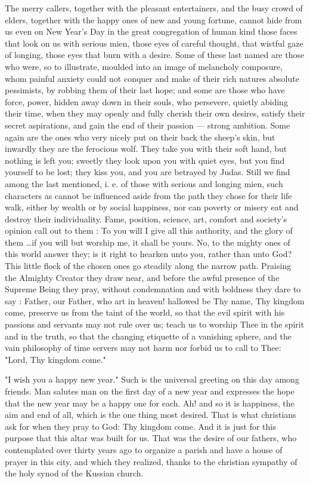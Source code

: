 The merry callers, together with the pleasant 
entertainers, and the busy crowd of elders, together
with the happy ones of new and young 
fortune, cannot hide from us even on New 
Year's Day in the great congregation of human 
kind those faces that look on us with serious 
mien, those eyes of careful thought, that wistful
gaze of longing, those eyes that burn with 
a desire. Some of these last named are those 
who were, so to illustrate, moulded into an 
image of melancholy composure, whom painful 
anxiety could not conquer and make of their 
rich natures absolute pessimists, by robbing 
them of their last hope; and some are those 
who have force, power, hidden away down in 
their souls, who persevere, quietly abiding their 
time, when they may openly and fully cherish 
their own desires, satisfy their secret aspirations,
and gain the end of their passion — strong 
ambition. Some again are the ones who very 
nicely put on their back the sheep's skin, but 
inwardly they are the ferocious wolf. They take 
you with their soft hand, but nothing is left 
you; sweetly they look upon you with quiet 
eyes, but you find yourself to be lost; they kiss 
you, and you are betrayed by Judas. Still we 
find among the last mentioned, i. e. of those 
with serious and longing mien, such characters 
as cannot be influenced aside from the path they 
chose for their life walk, either by wealth or by 
social happiness, nor can poverty or misery eat 
and destroy their individuality. Fame, position, 
science, art, comfort and society's opinion call 
out to them : To you will I give all this authority,
and the glory of them \ldots if you will
but worship me, it shall be yours. No, to the 
mighty ones of this world answer they; is it 
right to hearken unto you, rather than unto 
God? This little flock of the chosen ones go 
steadily along the narrow path. Praising the 
Almighty Creator they draw near, and before 
the awful presence of the Supreme Being they 
pray, without condemnation and with boldness 
they dare to say : Father, our Father, who art 
in heaven! hallowed be Thy name, Thy kingdom
come, preserve us from the taint of the 
world, so that the evil spirit with his passions 
and servants may not rule over us; teach us to 
worship Thee in the spirit and in the truth, 
so that the changing etiquette of a vanishing 
sphere, and the vain philosophy of time servers 
may not harm nor forbid us to call to Thee: 
"Lord, Thy kingdom come." 

"I wish you a happy new year." Such is the 
universal greeting on this day among friends. 
Man salutes man on the first day of a new 
year and expresses the hope that the new year 
may be a happy one for each. Ah! and so it is 
happiness, the aim and end of all, which is the 
one thing most desired. That is what christians
ask for when they pray to God: Thy 
kingdom come. And it is just for this purpose
that this altar was built for us. That was the 
desire of our fathers, who contemplated over 
thirty years ago to organize a parish and have 
a house of prayer in this city, and which they 
realized, thanks to the christian sympathy of 
the holy synod of the Kussian church. 

